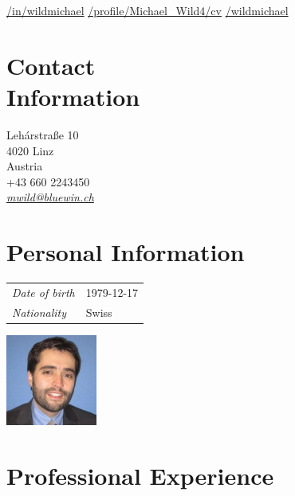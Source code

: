 \documentclass[line,11pt,a4paper]{../resume}
\newcommand{\mail}[1]{\textsl{\href{mailto:#1}{#1}}}
\begin{document}
\begin{resume}
\vspace{-4mm}
\-\hspace{-12.3mm}\begin{minipage}{15cm}
\href{https://linkedin.com/in/wildmichael}{\faLinkedinSquare/in/wildmichael}\quad
\href{https://xing.com/profile/Michael_Wild4/cv}{\faXingSquare/profile/Michael\_Wild4/cv}\quad
\href{https://github.com/wildmichael}{\faGithubSquare/wildmichael}
\end{minipage}

\begin{multicols}{3}

\section{\mysidestyle Contact\\Information}\vspace{0.9mm}

Leh\'{a}rstra{\ss}e 10 \\
4020 Linz \\
Austria \\
+43 660 2243450 \\
\mail{mwild@bluewin.ch}\\

\columnbreak

\section{\mysidestyle Personal Information}\vspace{2mm}

\begin{tabular}{@{}ll}
\textsl{Date of birth} & 1979-12-17 \\
\textsl{Nationality}   & Swiss
\end{tabular}

\columnbreak
\vspace*{-9mm}\hfill\includegraphics[width=30mm]{../mwild}

\end{multicols}

\section{\mysidestyle Professional Experience}\vspace{2mm}


\end{resume}
\end{document}
